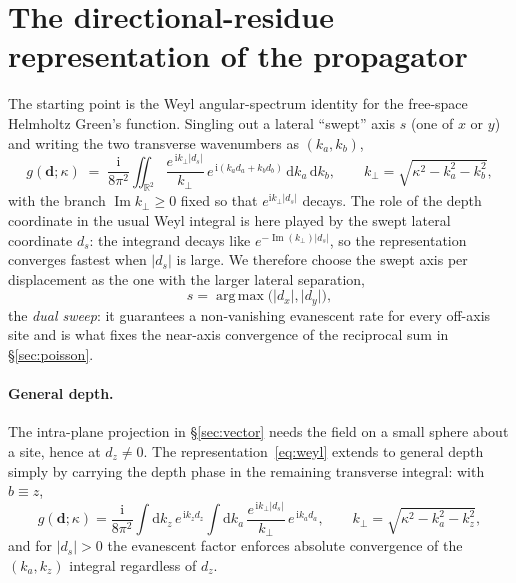 \documentclass[11pt,a4paper]{article}
\newcommand{\rd}{\mathrm{d}}
\newcommand{\ii}{\mathrm{i}}
\newcommand{\Imm}{\operatorname{Im}}
\newcommand{\kperp}{k_{\perp}}
\begin{document}
\section{The directional-residue representation of the propagator}
\label{sec:residue}

The starting point is the Weyl angular-spectrum identity for the free-space
Helmholtz Green's function. Singling out a lateral ``swept'' axis $s$ (one of
$x$ or $y$) and writing the two transverse wavenumbers as $(k_a,k_b)$,
\begin{equation}
  g(\mathbf{d};\kappa)
  \;=\;\frac{\ii}{8\pi^{2}}
        \iint_{\mathbb{R}^{2}}
        \frac{e^{\,\ii\kperp\lvert d_s\rvert}}{\kperp}\,
        e^{\,\ii(k_a d_a + k_b d_b)}\,
        \rd k_a\,\rd k_b,
  \qquad
  \kperp=\sqrt{\kappa^{2}-k_a^{2}-k_b^{2}},
  \label{eq:weyl}
\end{equation}
with the branch $\Imm\kperp\ge 0$ fixed so that $e^{\ii\kperp\lvert d_s\rvert}$
decays. The role of the depth coordinate in the usual Weyl integral is here
played by the swept lateral coordinate $d_s$: the integrand decays like
$e^{-\Imm(\kperp)\lvert d_s\rvert}$, so the representation converges fastest
when $\lvert d_s\rvert$ is large. We therefore choose the swept axis per
displacement as the one with the larger lateral separation,
\begin{equation}
  s=\operatorname*{arg\,max}\bigl(\lvert d_x\rvert,\lvert d_y\rvert\bigr),
  \label{eq:argmax}
\end{equation}
the \emph{dual sweep}: it guarantees a non-vanishing evanescent rate for every
off-axis site and is what fixes the near-axis convergence of the reciprocal
sum in \S\ref{sec:poisson}.

\paragraph{General depth.} The intra-plane projection in \S\ref{sec:vector}
needs the field on a small sphere about a site, hence at $d_z\ne 0$. The
representation~\eqref{eq:weyl} extends to general depth simply by carrying the
depth phase in the remaining transverse integral: with $b\equiv z$,
\begin{equation}
  g(\mathbf{d};\kappa)
  =\frac{\ii}{8\pi^{2}}
   \int \rd k_z\, e^{\,\ii k_z d_z}
   \int \rd k_a\,
   \frac{e^{\,\ii\kperp\lvert d_s\rvert}}{\kperp}\,
   e^{\,\ii k_a d_a},
   \qquad
   \kperp=\sqrt{\kappa^{2}-k_a^{2}-k_z^{2}},
  \label{eq:weyl_z}
\end{equation}
and for $\lvert d_s\rvert>0$ the evanescent factor enforces absolute
convergence of the $(k_a,k_z)$ integral regardless of $d_z$.
\end{document}
